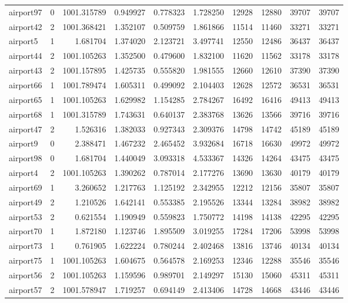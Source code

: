 \begin{longtable}{|l|r|r|r|r|r|r|r|r|r|}
airport97 & 0 & 1001.315789 & 0.949927 & 0.778323 & 1.728250 & 12928 & 12880 & 39707 & 39707 \\
airport42 & 2 & 1001.368421 & 1.352107 & 0.509759 & 1.861866 & 11514 & 11460 & 33271 & 33271 \\
airport5 & 1 & 1.681704 & 1.374020 & 2.123721 & 3.497741 & 12550 & 12486 & 36437 & 36437 \\
airport44 & 2 & 1001.105263 & 1.352500 & 0.479600 & 1.832100 & 11620 & 11562 & 33178 & 33178 \\
airport43 & 2 & 1001.157895 & 1.425735 & 0.555820 & 1.981555 & 12660 & 12610 & 37390 & 37390 \\
airport66 & 1 & 1001.789474 & 1.605311 & 0.499092 & 2.104403 & 12628 & 12572 & 36531 & 36531 \\
airport65 & 1 & 1001.105263 & 1.629982 & 1.154285 & 2.784267 & 16492 & 16416 & 49413 & 49413 \\
airport68 & 1 & 1001.315789 & 1.743631 & 0.640137 & 2.383768 & 13626 & 13566 & 39716 & 39716 \\
airport47 & 2 & 1.526316 & 1.382033 & 0.927343 & 2.309376 & 14798 & 14742 & 45189 & 45189 \\
airport9 & 0 & 2.388471 & 1.467232 & 2.465452 & 3.932684 & 16718 & 16630 & 49972 & 49972 \\
airport98 & 0 & 1.681704 & 1.440049 & 3.093318 & 4.533367 & 14326 & 14264 & 43475 & 43475 \\
airport4 & 2 & 1001.105263 & 1.390262 & 0.787014 & 2.177276 & 13690 & 13630 & 40179 & 40179 \\
airport69 & 1 & 3.260652 & 1.217763 & 1.125192 & 2.342955 & 12212 & 12156 & 35807 & 35807 \\
airport49 & 2 & 1.210526 & 1.642141 & 0.553385 & 2.195526 & 13344 & 13284 & 38982 & 38982 \\
airport53 & 2 & 0.621554 & 1.190949 & 0.559823 & 1.750772 & 14198 & 14138 & 42295 & 42295 \\
airport70 & 1 & 1.872180 & 1.123746 & 1.895509 & 3.019255 & 17284 & 17206 & 53998 & 53998 \\
airport73 & 1 & 0.761905 & 1.622224 & 0.780244 & 2.402468 & 13816 & 13746 & 40134 & 40134 \\
airport75 & 1 & 1001.105263 & 1.604675 & 0.564578 & 2.169253 & 12346 & 12288 & 35546 & 35546 \\
airport56 & 2 & 1001.105263 & 1.159596 & 0.989701 & 2.149297 & 15130 & 15060 & 45311 & 45311 \\
airport57 & 2 & 1001.578947 & 1.719257 & 0.694149 & 2.413406 & 14728 & 14668 & 43446 & 43446 \\

\end{longtable}

